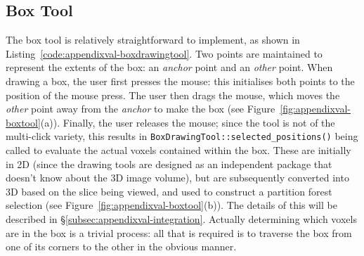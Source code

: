 \subsection{Box Tool}

The box tool is relatively straightforward to implement, as shown in Listing~\ref{code:appendixval-boxdrawingtool}. Two points are maintained to represent the extents of the box: an \emph{anchor} point and an \emph{other} point. When drawing a box, the user first presses the mouse: this initialises both points to the position of the mouse press. The user then drags the mouse, which moves the \emph{other} point away from the \emph{anchor} to make the box (see Figure~\ref{fig:appendixval-boxtool}(a)). Finally, the user releases the mouse; since the tool is not of the multi-click variety, this results in \texttt{BoxDrawingTool::selected_positions()} being called to evaluate the actual voxels contained within the box. These are initially in 2D (since the drawing tools are designed as an independent package that doesn't know about the 3D image volume), but are subsequently converted into 3D based on the slice being viewed, and used to construct a partition forest selection (see Figure~\ref{fig:appendixval-boxtool}(b)). The details of this will be described in \S\ref{subsec:appendixval-integration}. Actually determining which voxels are in the box is a trivial process: all that is required is to traverse the box from one of its corners to the other in the obvious manner.

